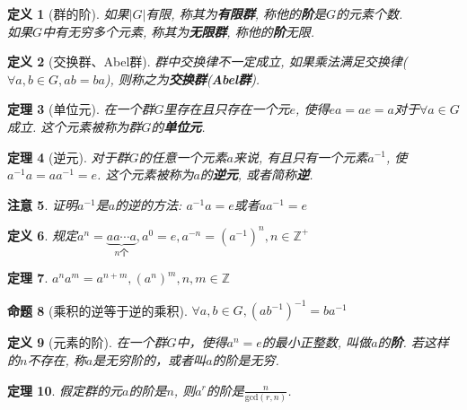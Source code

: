 \documentclass[UTF8]{ctexart}
\newtheorem{Definition}{定义}%
\newtheorem{Theorem}[Definition]{定理}
\newtheorem{Remark}[Definition]{注意}
\newtheorem{Proposition}[Definition]{命题}
\begin{document}
\begin{Definition}[群的阶]
如果$|G|$有限, 称其为\textbf{有限群}, 称他的\textbf{阶}是$G$的元素个数. \\
如果$G$中有无穷多个元素, 称其为\textbf{无限群}, 称他的\textbf{阶}无限.
\end{Definition}

\begin{Definition}[交换群、Abel群]
群中交换律不一定成立, 如果乘法满足交换律($\forall a, b \in G, ab = ba$), 则称之为\textbf{交换群}(\textbf{Abel群}).
\end{Definition}

\begin{Theorem}[单位元]
在一个群$G$里存在且只存在一个元$e$, 使得$ea = ae = a$对于$\forall a \in G$成立. 这个元素被称为群$G$的\textbf{单位元}.
\end{Theorem}

\begin{Theorem}[逆元]
对于群$G$的任意一个元素$a$来说, 有且只有一个元素$a^{-1}$, 
使 $a^{-1} a = a a^{-1} = e$. 这个元素被称为$a$的\textbf{逆元}, 或者简称\textbf{逆}.
\end{Theorem}

\begin{Remark}
证明$a^{-1}$是$a$的逆的方法: $a^{-1}a = e$或者$aa^{-1} = e$
\end{Remark}

\begin{Definition}
规定$a^n = \underbrace{a a \cdots a}_{n\text{个}}, a^0 = e, a^{-n} = (a^{-1})^n, n \in \mathbb{Z}^{+}$
\end{Definition}

\begin{Theorem}
$ a^n a^m = a^{n+m}, (a^n)^m, n, m \in \mathbb{Z} $
\end{Theorem}

\begin{Proposition}[乘积的逆等于逆的乘积]
$\forall a, b \in G, {(ab^{-1})}^{-1} = b a^{-1}$
\end{Proposition}

\begin{Definition}[元素的阶]
在一个群$G$中，使得$a^n = e$的最小正整数, 叫做$a$的\textbf{阶}. 若这样的$n$不存在, 称$a$是无穷阶的，或者叫$a$的阶是无穷.
\end{Definition}

\begin{Theorem}
假定群的元$a$的阶是$n$, 则$a^r$的阶是$\displaystyle \frac{n}{\text{gcd}(r, n)}$.
\end{Theorem}
\end{document}
